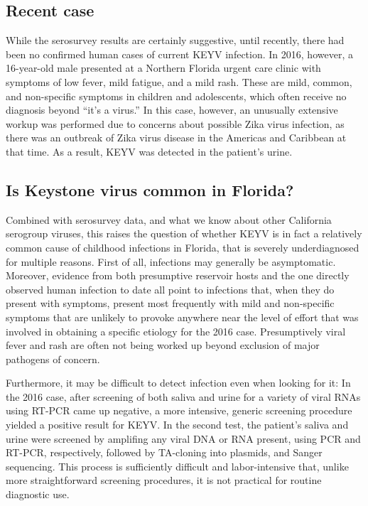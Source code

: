 \documentclass[12pt]{article}
\newcommand{\cjh}{\textcolor{blue}{cjh}}
\newcommand{\msg}[3]{(#1 $\rightarrow$ #2: #3)}
\newcommand{\mcc}[1]{\msg\cjh\cjh{#1}}
\begin{document}

        \subsection{Recent case}
            \label{recent-case}
            While the serosurvey results are certainly suggestive, until recently, there had been no confirmed human cases of current KEYV infection. In 2016, however, a 16-year-old male presented at a Northern Florida urgent care clinic with symptoms of low fever, mild fatigue, and a mild rash. These are mild, common, and non-specific symptoms in children and adolescents, which often receive no diagnosis beyond ``it's a virus.'' In this case, however, an unusually extensive workup was performed due to concerns about possible Zika virus infection, as there was an outbreak of Zika virus disease in the Americas and Caribbean at that time. As a result, KEYV was detected in the patient's urine.\cite{lednicky2018keystone}
        

        \subsection{Is Keystone virus common in Florida?}
            \label{raises-the-question}
            Combined with serosurvey data, and what we know about other California serogroup viruses, this raises the question of whether KEYV is in fact a relatively common cause of childhood infections in Florida, that is severely underdiagnosed for multiple reasons. First of all, infections may generally be asymptomatic. Moreover, evidence from both presumptive reservoir hosts and the one directly observed human infection to date all point to infections that, when they do present with symptoms, present most frequently with mild and non-specific symptoms that are unlikely to provoke anywhere near the level of effort that was involved in obtaining a specific etiology for the 2016 case. Presumptively viral fever and rash are often not being worked up beyond exclusion of major pathogens of concern.
        
            Furthermore, it may be difficult to detect infection even when looking for it: In the 2016 case, after screening of both saliva and urine for a variety of viral RNAs using RT-PCR came up negative, a more intensive, generic screening procedure yielded a positive result for KEYV.  In the second test, the patient's saliva and urine were screened by amplifing any viral DNA or RNA present, using PCR and RT-PCR, respectively, followed by TA-cloning into plasmids, and Sanger sequencing\cite{lednicky2018keystone}. This process is sufficiently difficult and labor-intensive that, unlike more straightforward screening procedures, it is not practical for routine diagnostic use.\cite{lednicky2019personal}
\end{document}
